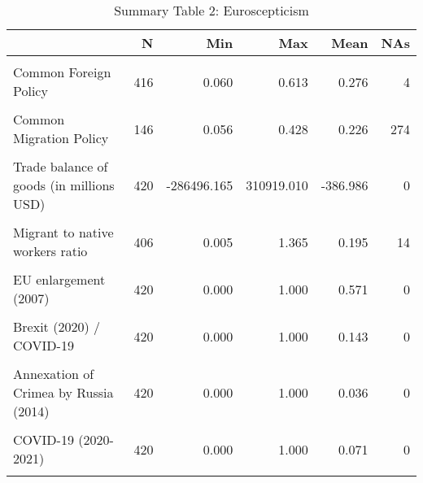 \begin{table}[!h]
\centering
\caption{Summary Table 2: Euroscepticism}
\centering
\begin{tabular}[t]{lrrrrr}
\toprule
  & N & Min & Max & Mean & NAs\\
\midrule
\cellcolor{gray!10}{Single Currency} & \cellcolor{gray!10}{416} & \cellcolor{gray!10}{0.061} & \cellcolor{gray!10}{0.854} & \cellcolor{gray!10}{0.326} & \cellcolor{gray!10}{4}\\
Common Foreign Policy & 416 & 0.060 & 0.613 & 0.276 & 4\\
\cellcolor{gray!10}{Common Defence Policy} & \cellcolor{gray!10}{416} & \cellcolor{gray!10}{0.061} & \cellcolor{gray!10}{0.713} & \cellcolor{gray!10}{0.227} & \cellcolor{gray!10}{4}\\
Common Migration Policy & 146 & 0.056 & 0.428 & 0.226 & 274\\
\cellcolor{gray!10}{Common Trade Policy} & \cellcolor{gray!10}{86} & \cellcolor{gray!10}{0.044} & \cellcolor{gray!10}{0.320} & \cellcolor{gray!10}{0.176} & \cellcolor{gray!10}{334}\\
\addlinespace
Trade balance of goods (in millions USD) & 420 & -286496.165 & 310919.010 & -386.986 & 0\\
\cellcolor{gray!10}{FDI net balance (in millions USD)} & \cellcolor{gray!10}{406} & \cellcolor{gray!10}{-162613.809} & \cellcolor{gray!10}{296304.498} & \cellcolor{gray!10}{-9321.383} & \cellcolor{gray!10}{14}\\
Migrant to native workers ratio & 406 & 0.005 & 1.365 & 0.195 & 14\\
\cellcolor{gray!10}{EU enlargement (2004)} & \cellcolor{gray!10}{420} & \cellcolor{gray!10}{0.000} & \cellcolor{gray!10}{1.000} & \cellcolor{gray!10}{0.679} & \cellcolor{gray!10}{0}\\
EU enlargement (2007) & 420 & 0.000 & 1.000 & 0.571 & 0\\
\addlinespace
\cellcolor{gray!10}{EU enlargement (2013)} & \cellcolor{gray!10}{420} & \cellcolor{gray!10}{0.000} & \cellcolor{gray!10}{1.000} & \cellcolor{gray!10}{0.393} & \cellcolor{gray!10}{0}\\
Brexit (2020) / COVID-19 & 420 & 0.000 & 1.000 & 0.143 & 0\\
\cellcolor{gray!10}{Euro area sovereign debt crisis (2010-2012)} & \cellcolor{gray!10}{420} & \cellcolor{gray!10}{0.000} & \cellcolor{gray!10}{1.000} & \cellcolor{gray!10}{0.107} & \cellcolor{gray!10}{0}\\
Annexation of Crimea by Russia (2014) & 420 & 0.000 & 1.000 & 0.036 & 0\\
\cellcolor{gray!10}{Refugee crisis (2015)} & \cellcolor{gray!10}{420} & \cellcolor{gray!10}{0.000} & \cellcolor{gray!10}{1.000} & \cellcolor{gray!10}{0.036} & \cellcolor{gray!10}{0}\\
\addlinespace
COVID-19 (2020-2021) & 420 & 0.000 & 1.000 & 0.071 & 0\\
\cellcolor{gray!10}{Russian invasion of Ukraine (2022)} & \cellcolor{gray!10}{420} & \cellcolor{gray!10}{0.000} & \cellcolor{gray!10}{1.000} & \cellcolor{gray!10}{0.071} & \cellcolor{gray!10}{0}\\
\bottomrule
\end{tabular}
\end{table}

